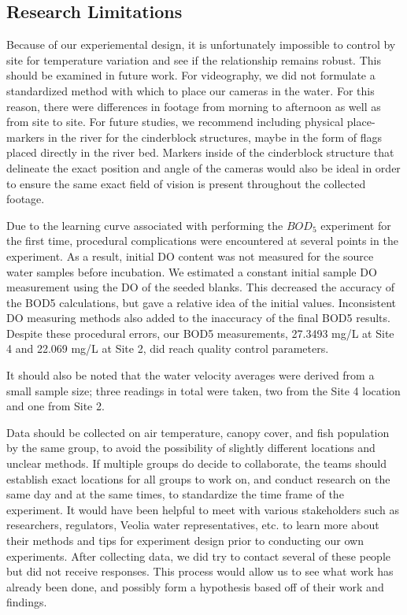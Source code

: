 \documentclass{article}\usepackage[]{graphicx}\usepackage[]{color}
\begin{document}
\subsection{Research Limitations}

Because of our experiemental design, it is unfortunately impossible to control by site for temperature variation and see if the relationship remains robust. This should be examined in future work. For videography, we did not formulate a standardized method with which to place our cameras in the water. For this reason, there were differences in footage from morning to afternoon as well as from site to site. For future studies, we recommend including physical place-markers in the river for the cinderblock structures, maybe in the form of flags placed directly in the river bed. Markers inside of the cinderblock structure that delineate the exact position and angle of the cameras would also be ideal in order to ensure the same exact field of vision is present throughout the collected footage. 

Due to the learning curve associated with performing the $BOD_5$ experiment for the first time, procedural complications were encountered at several points in the experiment. As a result, initial DO content was not measured for the source water samples before incubation. We estimated a constant initial sample DO measurement using the DO of the seeded blanks. This decreased the accuracy of the BOD5 calculations, but gave a relative idea of the initial values. Inconsistent DO measuring methods also added to the inaccuracy of the final BOD5 results. Despite these procedural errors, our BOD5 measurements, 27.3493 mg/L at Site 4 and 22.069 mg/L at Site 2, did reach quality control parameters.

It should also be noted that the water velocity averages were derived from a small sample size; three readings in total were taken, two from the Site 4 location and one from Site 2.

Data should be collected on air temperature, canopy cover, and fish population by the same group, to avoid the possibility of slightly different locations and unclear methods. If multiple groups do decide to collaborate, the teams should establish exact locations for all groups to work on, and conduct research on the same day and at the same times, to standardize the time frame of the experiment. It would have been helpful to meet with various stakeholders such as researchers, regulators, Veolia water representatives, etc. to learn more about their methods and tips for experiment design prior to conducting our own experiments. After collecting data, we did try to contact several of these people but did not receive responses. This process would allow us to see what work has already been done, and possibly form a hypothesis based off of their work and findings.
\end{document}
